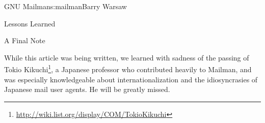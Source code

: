\begin{aosachapter}{GNU Mailman}{s:mailman}{Barry Warsaw}
\begin{aosasect1}{Lessons Learned}
\begin{aosasect3}{A Final Note}

While this article was being written, we learned with
sadness of the passing of Tokio
Kikuchi\footnote{\url{http://wiki.list.org/display/COM/TokioKikuchi}},
a Japanese professor who contributed heavily to Mailman, and was
especially knowledgeable about internationalization and the
idiosyncrasies of Japanese mail user agents.  He will be greatly
missed.

\end{aosasect3}

\end{aosasect1}

\end{aosachapter}

